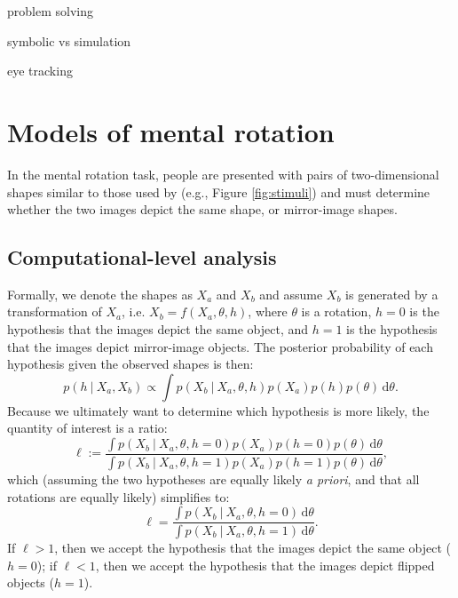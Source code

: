 \documentclass[10pt,letterpaper]{article}
\newcommand{\hi}[0]{h=0}
\newcommand{\hf}[0]{h=1}
\newcommand{\dif}[0]{\,\mathrm{d}}
\begin{document}
problem solving \cite{Hegarty2004, Schwartz1999}

symbolic vs simulation \cite{Schwartz:1996uy}

eye tracking \cite{Just1976}

\section{Models of mental rotation}

In the mental rotation task, people are presented with pairs of
two-dimensional shapes similar to those used by \cite{Cooper:1975wp}
(e.g., Figure \ref{fig:stimuli}) and must determine whether the two
images depict the same shape, or mirror-image shapes.

\subsection{Computational-level analysis}

Formally, we denote the shapes as $X_a$ and $X_b$ and assume $X_b$ is
generated by a transformation of $X_a$, i.e. $X_b=f(X_a, \theta, h)$,
where $\theta$ is a rotation, $h=0$ is the hypothesis that the images
depict the same object, and $h=1$ is the hypothesis that the images
depict mirror-image objects. The posterior probability of each
hypothesis given the observed shapes is then:
\begin{equation}
  p(h\ \vert\ X_a, X_b) \propto \int p(X_b\ \vert\ X_a, \theta, h)p(X_a)p(h)p(\theta)\dif\theta.
  \label{eq:posterior}
\end{equation}
Because we ultimately want to determine which hypothesis is more
likely, the quantity of interest is a ratio:
\begin{equation*}
  \ell := \frac{\int p(X_b\ \vert\ X_a, \theta, \hi)p(X_a)p(\hi)p(\theta)\dif\theta}{\int p(X_b\ \vert\ X_a, \theta, \hf)p(X_a)p(\hf)p(\theta)\dif\theta},
\end{equation*}
which (assuming the two hypotheses are equally likely \textit{a
  priori}, and that all rotations are equally likely) simplifies to:
\begin{equation}
  \ell = \frac{\int p(X_b\ \vert\ X_a, \theta, \hi)\dif\theta}{\int p(X_b\ \vert\ X_a, \theta, \hf)\dif\theta}.
  \label{eq:lh-ratio}
\end{equation}
If $\ell > 1$, then we accept the hypothesis that the images depict
the same object ($\hi$); if $\ell < 1$, then we accept the hypothesis
that the images depict flipped objects ($\hf$).
\end{document}
